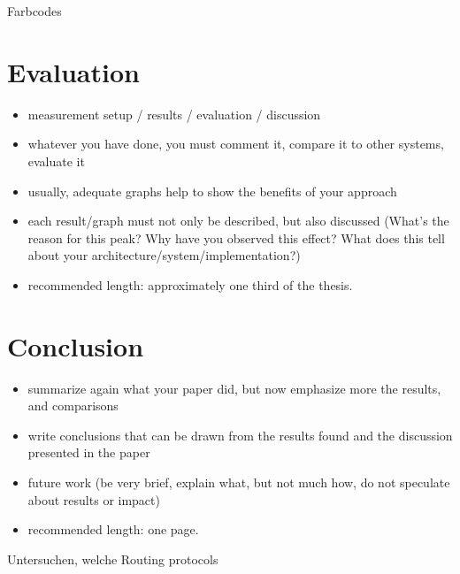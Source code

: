 \documentclass[]{nsm-thesis}
\begin{document}
Farbcodes




\chapter{Evaluation}


\begin{itemize}
\item measurement setup / results / evaluation / discussion
\item whatever you have done, you must comment it, compare it to other systems, evaluate it
\item usually, adequate graphs help to show the benefits of your approach
\item each result/graph must not only be described, but also discussed (What's the reason for this peak? Why have you observed this effect? What does this tell about your architecture/system/implementation?)
\item recommended length: approximately one third of the thesis.
\end{itemize}



\chapter{Conclusion}


\begin{itemize}
\item summarize again what your paper did, but now emphasize more the results, and comparisons
\item write conclusions that can be drawn from the results found and the discussion presented in the paper
\item future work (be very brief, explain what, but not much how, do not speculate about results or impact)
\item recommended length: one page.
\end{itemize}

Untersuchen, welche Routing protocols

\cleardoublepage

\listofabbreviations
\clearpage

\listoffigures
\clearpage

\listoftables
\clearpage

\printbibliography
\end{document}
